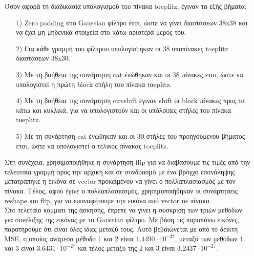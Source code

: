 \documentclass{article}
\begin{document}
	\noindent
	Όσον αφορά τη διαδικασία υπολογισμού του πίνακα toeplitz, έγιναν τα εξής βήματα:
	\noindent
	\begin{itemize}
		\item[1)] Ζero padding στο Gaussian φίλτρο έτσι, ώστε να γίνει διαστάσεων 38x38 και να έχει μη μηδενικά στοιχεία στο κάτω αριστερά μερος του.
		\item[2)] Για κάθε γραμμή του φίλτρου υπολογίστηκαν οι 38 υποπίνακες toeplitz διαστάσεων 38x30.
		\item[3)] Mε τη βοήθεια της συνάρτηση cat ένώθηκαν και οι 38 πίνακες ετσι, ώστε να υπολογιστεί η πρώτη block στήλη του πίνακα tοeplitz.
		\item[4)] Mε τη βοήθεια της συνάρτηση circshift έγιναν shift οι block πίνακες προς τα κάτω και κυκλικά, για να υπολογιστούν και οι υπόλοιπες στήλες του πίνακα tοeplitz.
		\item[5)] Mε τη συνάρτηση cat ένώθηκαν και οι 30 στήλες του προηγούμενου βήματος ετσι, ώστε να υπολογιστεί ο τελικός πίνακας toeplitz.
	\end{itemize}

	\noindent
	Στη συνέχεια, χρησιμοποιήθηκε η συνάρτηση flip για να διαβάσουμε τις τιμές από την τελευταια γραμμή προς την αρχική και σε συνδυασμό με ένα βρόγχο επανάληψης μετατράπηκε η εικόνα σε vector προκειμένου να γίνει ο πολλαπλασιασμός με τον πίνακα. Τέλος, αφού έγινε ο πολλαπλασιασμός, χρησιμοποιήθηκαν οι συνάρτησεις reshape και flip, για να επαναφέρουμε την εικόνα από vector σε πίνακα.\\
	
	\noindent
	Στο τελεταίο κομματι της άσκησης, έπρεπε να γίνει η σύσκριση των τριών μεθόδων για συνέλιξης της εικόνας με το Gaussian φίλτρο. Με βάση τις παραπάνω εικόνες, παρατηρούμε ότι είναι όλες ίδιες μεταξύ τους. Αυτό βεβαιώνεται με από το δείκτη MSE, ο οποίος ανάμεσα μέθοδο 1 και 2 είναι $1.4490 \cdot 10^{-27}$, μεταξύ των μεθόδων 1 και 3 είναι $3.6431 \cdot 10^{-27}$ και τέλος μεταξύ της 2 και 3 είναι $3.2437 \cdot 10^{-27}$.
	 	
\end{document}
